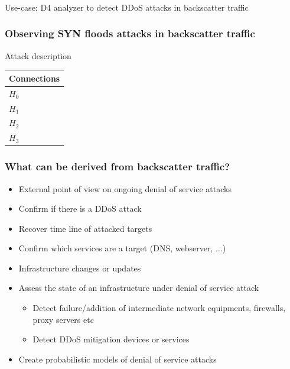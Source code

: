 \documentclass{beamer}
\begin{document}
\begin{frame}
        \frametitle{}
{\center Use-case: D4 analyzer to detect DDoS attacks in backscatter traffic
}
\end{frame}

\begin{frame}
\frametitle{Observing SYN floods attacks in backscatter traffic}
Attack description

\begin{center}
    \begin{tabular}{|l|}
        \hline
        Connections\\
        \hline
        $H_{0}$\\
        \hline
        $H_{1}$\\
        \hline
        $H_{2}$\\
        \hline
        $H_{3}$\\
        \hline
    \end{tabular}
\end{center}
\end{frame}

\begin{frame}
\frametitle{What can be derived from backscatter traffic?}

\begin{itemize}
    \item External point of view on ongoing denial of service attacks
    \item Confirm if there is a DDoS attack
    \item Recover time line of attacked targets
    \item Confirm which services are a target (DNS, webserver, $\dots$)
    \item Infrastructure changes or updates
    \item Assess the state of an infrastructure under denial of service attack
    \begin{itemize}
        \item Detect failure/addition of intermediate network equipments, firewalls, proxy servers etc
        \item Detect DDoS mitigation devices or services
    \end{itemize}
    \item Create probabilistic models of denial of service attacks
\end{itemize}
\end{frame}
\end{document}
